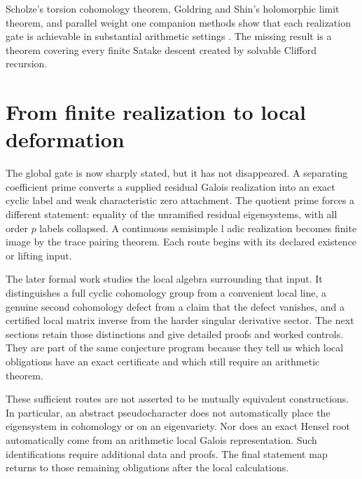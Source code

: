 Scholze's torsion cohomology theorem, Goldring and Shin's holomorphic limit theorem, and parallel weight one companion methods show that each realization gate is achievable in substantial arithmetic settings \cite{Scholze2015,GoldringShin2014,GeeKassaei2013,DimitrovWiese2020}. The missing result is a theorem covering every finite Satake descent created by solvable Clifford recursion.

\section{From finite realization to local deformation}\label{sec:conclusion}

The global gate is now sharply stated, but it has not disappeared. A separating coefficient prime converts a supplied residual Galois realization into an exact cyclic label and weak characteristic zero attachment. The quotient prime forces a different statement: equality of the unramified residual eigensystems, with all order \(p\) labels collapsed. A continuous semisimple l adic realization becomes finite image by the trace pairing theorem. Each route begins with its declared existence or lifting input.

The later formal work studies the local algebra surrounding that input. It distinguishes a full cyclic cohomology group from a convenient local line, a genuine second cohomology defect from a claim that the defect vanishes, and a certified local matrix inverse from the harder singular derivative sector. The next sections retain those distinctions and give detailed proofs and worked controls. They are part of the same conjecture program because they tell us which local obligations have an exact certificate and which still require an arithmetic theorem.

These sufficient routes are not asserted to be mutually equivalent constructions. In particular, an abstract pseudocharacter does not automatically place the eigensystem in cohomology or on an eigenvariety. Nor does an exact Hensel root automatically come from an arithmetic local Galois representation. Such identifications require additional data and proofs. The final statement map returns to those remaining obligations after the local calculations.

